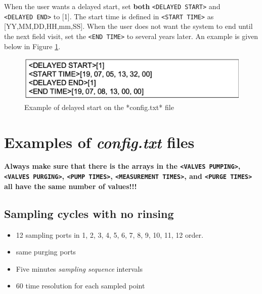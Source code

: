 \documentclass[]{book}
\providecommand{\tightlist}{%
  \setlength{\itemsep}{0pt}\setlength{\parskip}{0pt}}
\begin{document}
When the user wants a delayed start, set \textbf{both} \texttt{\textless{}DELAYED\ START\textgreater{}} and \texttt{\textless{}DELAYED\ END\textgreater{}} to {[}1{]}. The start time is defined in \texttt{\textless{}START\ TIME\textgreater{}} as {[}YY,MM,DD,HH,mm,SS{]}. When the user does not want the system to end until the next field visit, set the \texttt{\textless{}END\ TIME\textgreater{}} to several years later. An example is given below in Figure \ref{fig:ConfigDelay}.

\begin{figure}

\includegraphics[width=0.5\linewidth]{pictures/ConfigDelay} \hfill{}

\caption{Example of delayed start on the *config.txt* file}\label{fig:ConfigDelay}
\end{figure}

\hypertarget{examples-of-config.txt-files}{%
\section{\texorpdfstring{Examples of \emph{config.txt} files}{Examples of config.txt files}}\label{examples-of-config.txt-files}}

\textbf{Always make sure that there is the arrays in the \texttt{\textless{}VALVES\ PUMPING\textgreater{}}, \texttt{\textless{}VALVES\ PURGING\textgreater{}}, \texttt{\textless{}PUMP\ TIMES\textgreater{}}, \texttt{\textless{}MEASUREMENT\ TIMES\textgreater{}}, and \texttt{\textless{}PURGE\ TIMES\textgreater{}} all have the same number of values!!!}

\hypertarget{sampling-cycles-with-no-rinsing}{%
\subsection{Sampling cycles with no rinsing}\label{sampling-cycles-with-no-rinsing}}

\begin{itemize}
\tightlist
\item
  12 sampling ports in 1, 2, 3, 4, 5, 6, 7, 8, 9, 10, 11, 12 order.
\item
  same purging ports
\item
  Five minutes \emph{sampling sequence} intervals
\item
  60 time resolution for each sampled point
\end{itemize}
\end{document}
